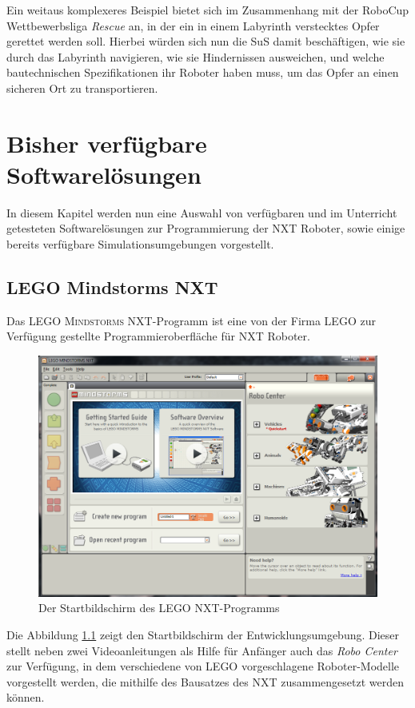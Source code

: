 \documentclass[paper=a4, DIV=calc, BCOR=12mm, twoside=on, onecolumn=on, open = right, titlepage =on, parskip =half-, headsepline = on, footsepline = off, chapterprefix = off, appendixprefix = on, fontsize = 12pt, numbers = noenddot, abstract = on]{scrbook}
\begin{document}
Ein weitaus komplexeres Beispiel bietet sich im Zusammenhang mit der RoboCup Wettbewerbsliga \emph{Rescue} an, in der ein in einem Labyrinth verstecktes Opfer gerettet werden soll. Hierbei würden sich nun die SuS damit beschäftigen, wie sie durch das Labyrinth navigieren, wie sie Hindernissen ausweichen, und welche bautechnischen Spezifikationen ihr Roboter haben muss, um das Opfer an einen sicheren Ort zu transportieren.

\chapter{Bisher verfügbare Softwarelösungen}
\label{sec:software bisher}
In diesem Kapitel werden nun eine Auswahl von verfügbaren und im Unterricht getesteten Softwarelösungen zur Programmierung der NXT Roboter, sowie einige bereits verfügbare Simulationsumgebungen vorgestellt. 


\section{LEGO Mindstorms NXT}
\label{sec:LMNXT}

Das \textsc{LEGO Mindstorms} NXT-Programm ist eine von der Firma \textsc{LEGO} zur Verfügung gestellte Programmieroberfläche für NXT Roboter.

\begin{figure}[htbp]
\centering
\includegraphics[width= \textwidth]{images/Startbildschirm_NXT.png} 
\caption[Der Startbildschirm des \textsc{LEGO} NXT-Programms]{Der Startbildschirm des \textsc{LEGO} NXT-\-Pro\-gramms}
\label{fig:NXT Start}
\end{figure}
Die Abbildung \ref{fig:NXT Start} zeigt den Startbildschirm der Entwicklungsumgebung. Dieser stellt neben zwei Videoanleitungen als Hilfe für Anfänger auch das \emph{Robo Center} zur Verfügung, in dem verschiedene von \textsc{LEGO} vorgeschlagene Roboter-Modelle vorgestellt werden, die mithilfe des Bausatzes des NXT zusammengesetzt werden können.
\end{document}

